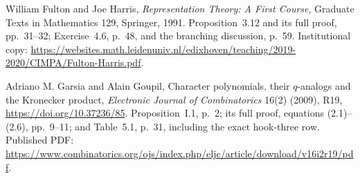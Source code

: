 William Fulton and Joe Harris,
\emph{Representation Theory: A First Course},
Graduate Texts in Mathematics 129, Springer, 1991.
Proposition~3.12 and its full proof, pp.~31--32;
Exercise~4.6, p.~48, and the branching discussion, p.~59.
Institutional copy:
\url{https://websites.math.leidenuniv.nl/edixhoven/teaching/2019-2020/CIMPA/Fulton-Harris.pdf}.

Adriano M. Garsia and Alain Goupil,
Character polynomials, their $q$-analogs and the Kronecker product,
\emph{Electronic Journal of Combinatorics} 16(2) (2009), R19,
\url{https://doi.org/10.37236/85}.
Proposition~I.1, p.~2; its full proof, equations (2.1)--(2.6),
pp.~9--11; and Table~5.1, p.~31, including the exact hook-three row.
Published PDF:
\url{https://www.combinatorics.org/ojs/index.php/eljc/article/download/v16i2r19/pdf}.
